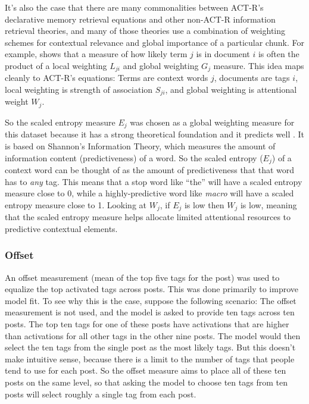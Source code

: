 \documentclass[10pt,letterpaper]{article}
\begin{document}
It's also the case that there are many commonalities between ACT-R's declarative memory retrieval equations and other non-ACT-R information retrieval theories,
and many of those theories use a combination of weighting schemes for contextual relevance and global importance of a particular chunk.
For example,  shows that a measure of how likely term $j$ is in document $i$ is often the product of a local weighting $L_{ji}$ and global weighting $G_{j}$ measure.
This idea maps cleanly to ACT-R's equations: 
Terms are context words $j$, documents are tags $i$, local weighting is strength of association $S_{ji}$, and global weighting is attentional weight $W_{j}$.

So the scaled entropy measure $E_{j}$ was chosen as a global weighting measure for this dataset because it has a strong theoretical foundation and it predicts well \cite{Dumais1991}.
It is based on Shannon's Information Theory, which measures the amount of information content (predictiveness) of a word.
So the scaled entropy ($E_{j}$) of a context word can be thought of as the amount of predictiveness that that word has to \emph{any} tag.
This means that a stop word like ``the'' will have a scaled entropy measure close to 0, while a highly-predictive word like \emph{macro} will have a scaled entropy measure close to 1.
Looking at $W_{j}$, if $E_{j}$ is low then $W_{j}$ is low, meaning that the scaled entropy measure helps allocate limited attentional resources to predictive contextual elements.

\subsubsection{Offset}

An offset measurement (mean of the top five tags for the post) was used to equalize the top activated tags across posts.
This was done primarily to improve model fit.
To see why this is the case, suppose the following scenario:
The offset measurement is not used, and the model is asked to provide ten tags across ten posts.
The top ten tags for one of these posts have activations that are higher than activations for all other tags in the other nine posts.
The model would then select the ten tags from the single post as the most likely tags.
But this doesn't make intuitive sense, because there is a limit to the number of tags that people tend to use for each post.
So the offset measure aims to place all of these ten posts on the same level, so that asking the model to choose ten tags from ten posts will select roughly a single tag from each post.
\end{document}
